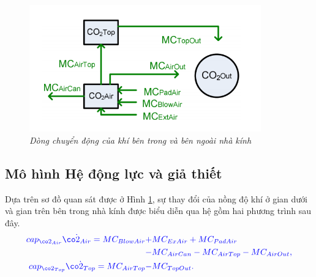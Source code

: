 \documentclass[13pt,a4paper]{article}
\begin{document}
			\begin{figure}[h!]
				\begin{center}
					\includegraphics[width=10cm]{co2_flow.png}
					\caption{\textit{Dòng chuyển động của khí  bên trong và bên ngoài nhà kính}}
					\label{h3}
				\end{center}
			\end{figure}
		\subsection{Mô hình Hệ động lực và giả thiết}
			Dựa trên sơ đồ quan sát được ở Hình \ref{h3}, sự thay đổi của nồng độ khí  ở gian dưới và gian trên bên trong nhà kính được biểu diễn qua hệ gồm hai phương trình sau đây. 
			\begin{align}
				\color{blue}
					cap_{\co2_{Air}}\dot{\co2_{Air}} = MC_{BlowAir} +& \textcolor{blue}{MC_{ExAir} + MC_{PadAir}} \nonumber \\ 
					\textcolor{blue}{-}& \textcolor{blue}{MC_{AirCan} - MC_{AirTop} - MC_{AirOut} ,}
					\label{ct1} \\
					\textcolor{blue}{cap_{\co2_{Top}}\dot{\co2_{Top}} = MC_{AirTop} -}& \textcolor{blue}{MC_{TopOut}.}
					\label{ct2}
				\color{blue}
			\end{align}
		
\end{document}
